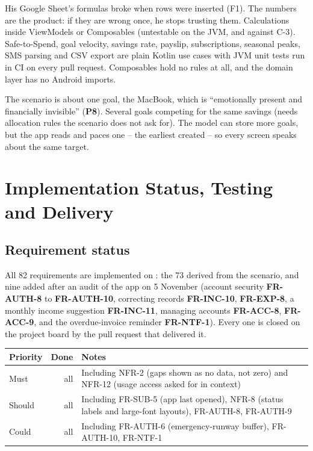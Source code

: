 \documentclass[11pt,a4paper]{article}
\newcommand{\req}[1]{\textsf{\textbf{\color{pfgreendark}#1}}}
\newcommand{\prob}[1]{\textsf{\textbf{\color{pfamberdark}#1}}}
\begin{document}
{His Google Sheet's formulas broke when rows were inserted (F1). The numbers are the product: if they are wrong once, he stops trusting them.}
{Calculations inside ViewModels or Composables (untestable on the JVM, and against C-3).}
{Safe-to-Spend, goal velocity, savings rate, payslip, subscriptions, seasonal peaks, SMS parsing and CSV export are plain Kotlin use cases with JVM unit tests run in CI on every pull request. Composables hold no rules at all, and the domain layer has no Android imports.}

{The scenario is about one goal, the MacBook, which is ``emotionally present and financially invisible'' (\prob{P8}).}
{Several goals competing for the same savings (needs allocation rules the scenario does not ask for).}
{The model can store more goals, but the app reads and paces one -- the earliest created -- so every screen speaks about the same target.}

\section{Implementation Status, Testing and Delivery}
\label{sec:status}

\subsection{Requirement status}
All 82 requirements are implemented on : the 73 derived from the scenario, and nine added after an audit of the app on 5 November (account security \req{FR-AUTH-8} to \req{FR-AUTH-10}, correcting records \req{FR-INC-10}, \req{FR-EXP-8}, a monthly income suggestion \req{FR-INC-11}, managing accounts \req{FR-ACC-8}, \req{FR-ACC-9}, and the overdue-invoice reminder \req{FR-NTF-1}). Every one is closed on the project board by the pull request that delivered it.

\begin{tabularx}{\textwidth}{|l|r|L|}
\hline
\textbf{Priority} & \textbf{Done} & \textbf{Notes}\\
\hline
Must & all & Including NFR-2 (gaps shown as no data, not zero) and NFR-12 (usage access asked for in context)\\
Should & all & Including FR-SUB-5 (app last opened), NFR-8 (status labels and large-font layouts), FR-AUTH-8, FR-AUTH-9\\
Could & all & Including FR-AUTH-6 (emergency-runway buffer), FR-AUTH-10, FR-NTF-1\\
\hline
\end{tabularx}
\end{document}
